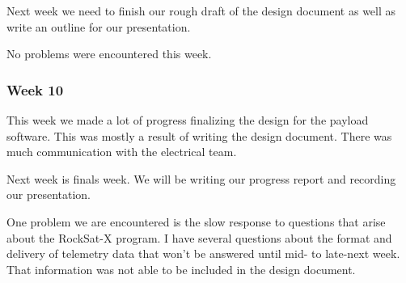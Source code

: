 Next week we need to finish our rough draft of the design document as well as write an outline for our presentation.

No problems were encountered this week.

\subsubsection{Week 10}
This week we made a lot of progress finalizing the design for the payload software. This was mostly a result of writing the design document. There was much communication with the electrical team.

Next week is finals week. We will be writing our progress report and recording our presentation.

One problem we are encountered is the slow response to questions that arise about the RockSat-X program. I have several questions about the format and delivery of telemetry data that won't be answered until mid- to late-next week. That information was not able to be included in the design document.